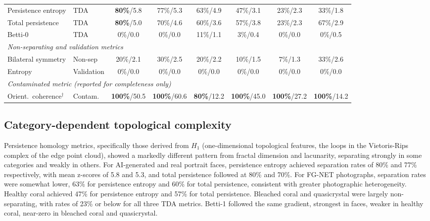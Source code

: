 \documentclass[a4paper,12pt]{article}
\begin{document}
\begin{landscape}
\begin{table}[ht]
\begin{tabular}{llcccccc}
Persistence entropy & TDA & \textbf{80\%}/5.8 & 77\%/5.3 & 63\%/4.9 & 47\%/3.1 & 23\%/2.3 & 33\%/1.8 \\
Total persistence & TDA & \textbf{80\%}/5.0 & 70\%/4.6 & 60\%/3.6 & 57\%/3.8 & 23\%/2.3 & 67\%/2.9 \\
Betti-0 & TDA & 0\%/0.0 & 0\%/0.0 & 11\%/1.1 & 3\%/0.4 & 0\%/0.0 & 0\%/0.5 \\
\midrule
\multicolumn{8}{l}{\textit{Non-separating and validation metrics}} \\[2pt]
Bilateral symmetry & Non-sep & 20\%/2.1 & 30\%/2.5 & 20\%/2.2 & 10\%/1.5 & 7\%/1.3 & 33\%/2.6 \\
Entropy & Validation & 0\%/0.0 & 0\%/0.0 & 0\%/0.0 & 0\%/0.0 & 0\%/0.0 & 0\%/0.0 \\
\midrule
\multicolumn{8}{l}{\textit{Contaminated metric (reported for completeness only)}} \\[2pt]
Orient.\ coherence$^\dagger$ & Contam. & \textbf{100\%}/50.5 & \textbf{100\%}/60.6 & \textbf{80\%}/12.2 & \textbf{100\%}/45.0 & \textbf{100\%}/27.2 & \textbf{100\%}/14.2 \\
\bottomrule
\end{tabular}
\end{table}
\end{landscape}

\subsection{Category-dependent topological complexity}

Persistence homology metrics, specifically those derived from $H_1$ (one-dimensional topological features, the loops in the Vietoris-Rips complex of the edge point cloud), showed a markedly different pattern from fractal dimension and lacunarity, separating strongly in some categories and weakly in others. For AI-generated and real portrait faces, persistence entropy achieved separation rates of 80\% and 77\% respectively, with mean z-scores of 5.8 and 5.3, and total persistence followed at 80\% and 70\%. For FG-NET photographs, separation rates were somewhat lower, 63\% for persistence entropy and 60\% for total persistence, consistent with greater photographic heterogeneity. Healthy coral achieved 47\% for persistence entropy and 57\% for total persistence. Bleached coral and quasicrystal were largely non-separating, with rates of 23\% or below for all three TDA metrics. Betti-1 followed the same gradient, strongest in faces, weaker in healthy coral, near-zero in bleached coral and quasicrystal.
\end{document}
